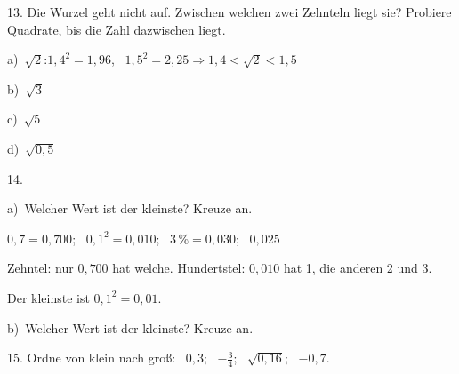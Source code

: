 \documentclass[11pt]{article}
\newcommand{\grau}[1]{{\color{mbgrau}#1}}
\begin{document}
\begin{pfaufg}{}{13.}{}
Die Wurzel geht nicht auf. Zwischen welchen zwei Zehnteln liegt sie? Probiere Quadrate, bis die Zahl dazwischen liegt.\par\smallskip
\grau{a)\ $\sqrt{2}$:\quad $1{,}4^2 = 1{,}96$, \ $1{,}5^2 = 2{,}25$\quad$\Rightarrow$\quad $1{,}4 < \sqrt{2} < 1{,}5$}\par\medskip
\noindent\begin{minipage}[t]{0.48\linewidth}\raggedright
b)\ $\sqrt{3}$
\end{minipage}\hfill
\begin{minipage}[t]{0.48\linewidth}\raggedright
c)\ $\sqrt{5}$
\end{minipage}\par\smallskip
\noindent\begin{minipage}[t]{0.48\linewidth}\raggedright
d)\ $\sqrt{0{,}5}$
\end{minipage}\par\smallskip
{}
\end{pfaufg}

\begin{pfaufg}{}{14.}{}
\grau{a)\ Welcher Wert ist der kleinste? Kreuze an. \kreuz{$0{,}7$} \kreuz{$0{,}1^2$} \kreuz{$3\,\%$} \kreuz{$0{,}025$}\par\smallskip $0{,}7 = 0{,}700$; \ $0{,}1^2 = 0{,}010$; \ $3\,\% = 0{,}030$; \ $0{,}025$\par Zehntel: nur $0{,}700$ hat welche. Hundertstel: $0{,}010$ hat 1, die anderen 2 und 3.\par Der kleinste ist $0{,}1^2 = 0{,}01$.}
\par\medskip
b)\ Welcher Wert ist der kleinste? Kreuze an.\par\smallskip {}\par {}
\end{pfaufg}

\begin{pfaufg}{}{15.}{}
Ordne von klein nach groß: \ $0{,}3$; \ $-\frac{3}{4}$; \ $\sqrt{0{,}16}$; \ $-0{,}7$.
\end{pfaufg}
\end{document}
